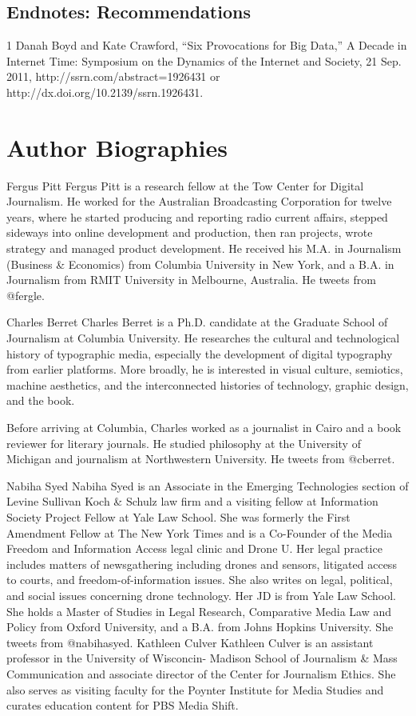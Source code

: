 \section{Endnotes: Recommendations}
1 Danah Boyd and Kate Crawford, ``Six Provocations for Big Data,'' A Decade in Internet Time: Symposium on the Dynamics of the Internet and Society, 21 Sep. 2011,
http://ssrn.com/abstract=1926431 or http://dx.doi.org/10.2139/ssrn.1926431.\\


\chapter{Author Biographies}

Fergus Pitt
Fergus Pitt is a research fellow at the Tow Center for Digital Journalism.
He worked for the Australian Broadcasting Corporation for twelve years,
where he started producing and reporting radio current affairs, stepped
sideways into online development and production, then ran projects, wrote
strategy and managed product development.
He received his M.A. in Journalism (Business & Economics) from Columbia
University in New York, and a B.A. in Journalism from RMIT University in
Melbourne, Australia.
He tweets from @fergle.


Charles Berret
Charles Berret is a Ph.D. candidate at the Graduate School of Journalism
at Columbia University. He researches the cultural and technological history
of typographic media, especially the development of digital typography
from earlier platforms. More broadly, he is interested in visual culture,
semiotics, machine aesthetics, and the interconnected histories of technology,
graphic design, and the book.


Before arriving at Columbia, Charles worked as a journalist in Cairo and a
book reviewer for literary journals. He studied philosophy at the University
of Michigan and journalism at Northwestern University.
He tweets from @cberret.


Nabiha Syed
Nabiha Syed is an Associate in the Emerging Technologies section of Levine
Sullivan Koch & Schulz law firm and a visiting fellow at Information Society
Project Fellow at Yale Law School. She was formerly the First Amendment
Fellow at The New York Times and is a Co-Founder of the Media Freedom
and Information Access legal clinic and Drone U.
Her legal practice includes matters of newsgathering including drones and
sensors, litigated access to courts, and freedom-of-information issues. She
also writes on legal, political, and social issues concerning drone technology.
Her JD is from Yale Law School. She holds a Master of Studies in Legal
Research, Comparative Media Law and Policy from Oxford University, and
a B.A. from Johns Hopkins University.
She tweets from @nabihasyed.
Kathleen Culver
Kathleen Culver is an assistant professor in the University of Wisconcin-
Madison School of Journalism & Mass Communication and associate director
of the Center for Journalism Ethics. She also serves as visiting faculty for
the Poynter Institute for Media Studies and curates education content for
PBS Media Shift.


